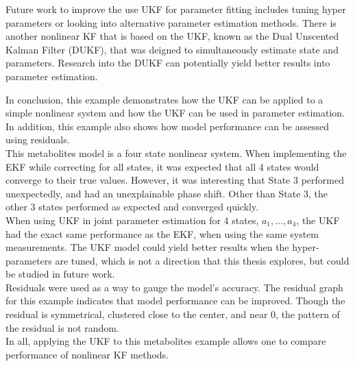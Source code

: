 \noindent Future work to improve the use UKF for parameter fitting includes tuning hyper parameters or looking into alternative parameter estimation methods. There is another nonlinear KF that is based on the UKF, known as the Dual Unscented Kalman Filter (DUKF), that was deigned to simultaneously estimate state and parameters. Research into the DUKF can potentially yield better results into parameter estimation.

\clearpage


\noindent In conclusion, this example demonstrates how the UKF can be applied to a simple nonlinear system and how the UKF can be used in parameter estimation. In addition, this example also shows how model performance can be assessed using residuals. \\ 

\noindent This metabolites model is a four state nonlinear system. When implementing the EKF while correcting for all states, it was expected that all 4 states would converge to their true values. However, it was interesting that State 3 performed unexpectedly, and had an unexplainable phase shift. Other than State 3, the other 3 states performed as expected and converged quickly. \\

\noindent When using UKF in joint parameter estimation for 4 states, $a_1, \hdots, a_4$, the UKF had the exact same performance as the EKF, when using the same system measurements. The UKF model could yield better results when the hyper-parameters are tuned, which is not a direction that this thesis explores, but could be studied in future work. \\

\noindent Residuals were used as a way to gauge the model's accuracy. The residual graph for this example indicates that model performance can be improved. Though the residual is symmetrical, clustered close to the center, and near 0, the pattern of the residual is not random. \\

\noindent In all, applying the UKF to this metabolites example allows one to compare performance of nonlinear KF methods. 














